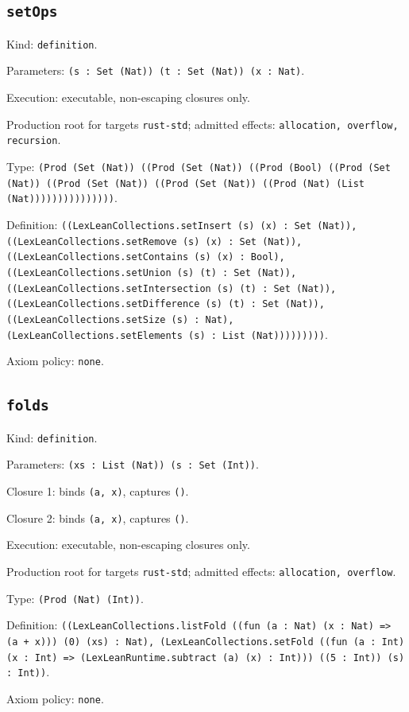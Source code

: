 \documentclass[11pt]{article}
\begin{document}
\subsection*{\texttt{setOps}}
\noindent Kind: \texttt{definition}.\par
\noindent Parameters: \texttt{(s : Set (Nat)) (t : Set (Nat)) (x : Nat)}.\par
\noindent Execution: executable, non-escaping closures only.\par
\noindent Production root for targets \texttt{rust-std}; admitted effects: \texttt{allocation, overflow, recursion}.\par
\noindent Type: \texttt{(Prod (Set (Nat)) ((Prod (Set (Nat)) ((Prod (Bool) ((Prod (Set (Nat)) ((Prod (Set (Nat)) ((Prod (Set (Nat)) ((Prod (Nat) (List (Nat)))))))))))))))}.\par
\noindent Definition: \texttt{((LexLeanCollections.setInsert (s) (x) : Set (Nat)), ((LexLeanCollections.setRemove (s) (x) : Set (Nat)), ((LexLeanCollections.setContains (s) (x) : Bool), ((LexLeanCollections.setUnion (s) (t) : Set (Nat)), ((LexLeanCollections.setIntersection (s) (t) : Set (Nat)), ((LexLeanCollections.setDifference (s) (t) : Set (Nat)), ((LexLeanCollections.setSize (s) : Nat), (LexLeanCollections.setElements (s) : List (Nat)))))))))}.\par
\noindent Axiom policy: \texttt{none}.\par
\subsection*{\texttt{folds}}
\noindent Kind: \texttt{definition}.\par
\noindent Parameters: \texttt{(xs : List (Nat)) (s : Set (Int))}.\par
\noindent Closure 1: binds \texttt{(a, x)}, captures \texttt{()}.\par
\noindent Closure 2: binds \texttt{(a, x)}, captures \texttt{()}.\par
\noindent Execution: executable, non-escaping closures only.\par
\noindent Production root for targets \texttt{rust-std}; admitted effects: \texttt{allocation, overflow}.\par
\noindent Type: \texttt{(Prod (Nat) (Int))}.\par
\noindent Definition: \texttt{((LexLeanCollections.listFold ((fun (a : Nat) (x : Nat) => (a + x))) (0) (xs) : Nat), (LexLeanCollections.setFold ((fun (a : Int) (x : Int) => (LexLeanRuntime.subtract (a) (x) : Int))) ((5 : Int)) (s) : Int))}.\par
\noindent Axiom policy: \texttt{none}.\par
\end{document}
